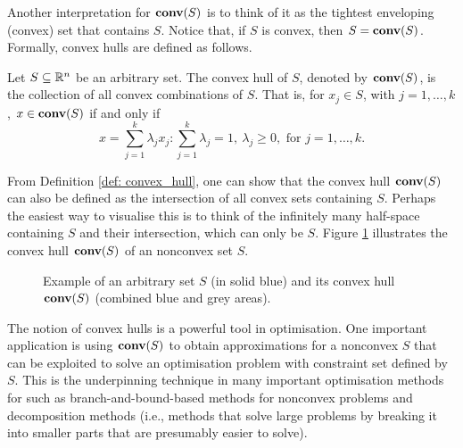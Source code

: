 Another interpretation for $\mathop{\bf conv}(S)$ is to think of it as the tightest enveloping (convex) set that contains $S$. Notice that, if $S$ is convex, then $S = \mathop{\bf conv}(S)$.  Formally, convex hulls are defined as follows.

\begin{definition}\label{def: convex_hull}
	Let $S \subseteq \mathbb{R}^n$ be an arbitrary set. The convex hull of $S$, denoted by $\mathop{\bf conv}(S)$, is the collection of all convex combinations of $S$. That is, for $x_j \in S$, with $j = 1,\dots, k$, $x \in \mathop{\bf conv}(S)$ if and only if 
	\begin{equation*}
		x = \sum_{j=1}^k \lambda_jx_j : \sum_{j=1}^k \lambda_j = 1, \ \lambda_j \geq 0, \text{ for } j = 1,\dots,k.
	\end{equation*}                       
\end{definition}
%

From Definition \ref{def: convex_hull}, one can show that the convex hull $\mathop{\bf conv}(S)$ can also be defined as the intersection of all convex sets containing $S$. Perhaps the easiest way to visualise this is to think of the infinitely many half-space containing $S$ and their intersection, which can only be $S$. Figure \ref{fig:convex_hull} illustrates the convex hull $\mathop{\bf conv}(S)$ of an nonconvex set $S$.
%
\begin{figure}[H]
\caption{Example of an arbitrary set $S$ (in solid blue) and its convex hull $\mathop{\bf conv}(S)$ (combined blue and grey areas).} \label{fig:convex_hull}
\end{figure}
%
The notion of convex hulls is a powerful tool in optimisation. One important application is using $\mathop{\bf conv}(S)$ to obtain approximations for a nonconvex $S$ that can be exploited to solve an optimisation problem with constraint set defined by $S$. This is the underpinning technique in many important optimisation methods for such as branch-and-bound-based methods for nonconvex problems and decomposition methods (i.e., methods that solve large problems by breaking it into smaller parts that are presumably easier to solve).  

